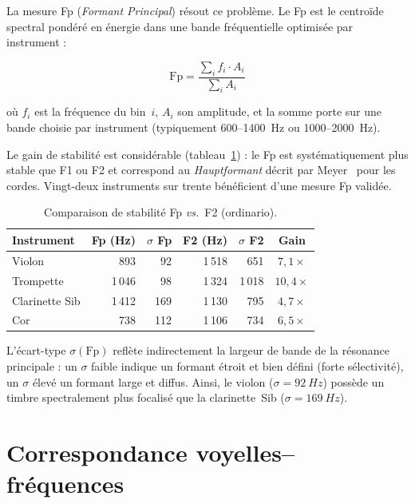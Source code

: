 \documentclass[11pt,a4paper]{article}
\begin{document}
La mesure Fp (\emph{Formant Principal}) résout ce problème. Le Fp est le
centroïde spectral pondéré en énergie dans une bande fréquentielle
optimisée par instrument :

\begin{equation}
  \mathrm{Fp} = \frac{\sum_i f_i \cdot A_i}{\sum_i A_i}
  \label{eq:fp}
\end{equation}

\noindent où $f_i$ est la fréquence du bin~$i$, $A_i$ son amplitude, et
la somme porte sur une bande choisie par instrument (typiquement
600--\SI{1400}{Hz} ou 1000--\SI{2000}{Hz}).

Le gain de stabilité est considérable
(tableau~\ref{tab:fp-stability}) : le Fp est systématiquement plus
stable que F1 ou F2 et correspond au \emph{Hauptformant} décrit par
Meyer~\cite{meyer2009} pour les cordes. Vingt-deux instruments sur
trente bénéficient d'une mesure Fp validée.

\begin{table}[ht]
\centering
\caption{Comparaison de stabilité Fp \emph{vs.}\ F2 (ordinario).}
\label{tab:fp-stability}
\begin{tabular}{lrrrrc}
\toprule
Instrument & Fp (Hz) & $\sigma$ Fp & F2 (Hz) & $\sigma$ F2 & Gain \\
\midrule
Violon         & 893  &  92 & 1\,518 & 651  & $7{,}1\times$ \\
Trompette      & 1\,046 &  98 & 1\,324 & 1\,018 & $10{,}4\times$ \\
Clarinette Sib & 1\,412 & 169 & 1\,130 & 795  & $4{,}7\times$ \\
Cor            & 738  & 112 & 1\,106 & 734  & $6{,}5\times$ \\
\bottomrule
\end{tabular}
\end{table}

L'écart-type $\sigma(\mathrm{Fp})$ reflète indirectement la largeur de
bande de la résonance principale : un $\sigma$ faible indique un formant
étroit et bien défini (forte sélectivité), un $\sigma$ élevé un formant
large et diffus. Ainsi, le violon ($\sigma = \SI{92}{Hz}$) possède un
timbre spectralement plus focalisé que la clarinette~Sib ($\sigma =
\SI{169}{Hz}$).


\section{Correspondance voyelles--fréquences}
\end{document}
